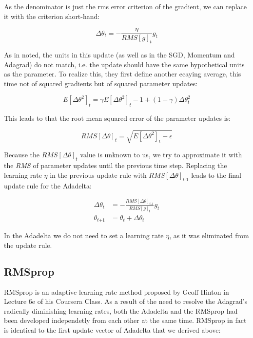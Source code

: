\documentclass[12pt,oneside,a4paper,parskip]{scrbook}
\begin{document}
As the denominator is just the \ac{rms} error criterion of the gradient, we can replace
it with the criterion short-hand: 

\begin{equation}
  \Delta\theta_\textit{t} = -\frac{\eta}{RMS[\textit{g}]_t} \textit{g}_\textit{t}
\end{equation}

As in \cite{AdadeltaAddition} noted, the units in this update (as well as in the SGD, Momentum and Adagrad) do not match,
i.e. the update should have the same hypothetical units as the parameter. To realize this, they first define another 
ecaying average, this time not of squared gradients but of squared parameter updates:

\begin{equation}
  \textit{E}[\Delta\theta^2]_t = \gamma\textit{E}[\Delta\theta^2]_t-1 + (1-\gamma)\Delta\theta^2_t
  \label{equ:adadelta_4}
\end{equation}

This leads to that the root mean squared error of the parameter updates is:

\begin{equation}
  \textit{RMS}[\Delta\theta]_t = \sqrt{\textit{E}[\Delta\theta^2]_t + \epsilon}
\end{equation}

Because the $\textit{RMS}[\Delta\theta]_t$ value is unknown to us, we try to approximate it with the \textit{RMS} of 
parameter updates until the previous time step. Replacing the learning rate $\eta$ in the previous update rule with $\textit{RMS}[\Delta\theta]_\textit{t-1}$
leads to the final update rule for the Adadelta:

\begin{equation}
  \begin{split}
  \Delta\theta_t &= - \frac{\textit{RMS}[\Delta\theta]_\textit{t-1}}{RMS[\textit{g}]_t} \textit{g}_\textit{t} \\
  \theta_\textit{t+1} &= \theta_t + \Delta\theta_t
  \end{split}
  \label{equ:adadelta_2}
\end{equation}

In the Adadelta we do not need to set a learning rate $\eta$, as it was eliminated from the update rule. \cite{overvieDiffRSLVQ}

\subsection{RMSprop}
RMSprop is an adaptive learning rate method proposed by Geoff Hinton in Lecture 6e of his Coursera Class. \cite{RMSprop_Hinton}
As a result of the need to resolve the Adagrad's radically diminishing learning rates, both the Adadelta and 
the RMSprop had been developed independetly from each other at the same time. RMSprop in fact is identical
to the first update vector of Adadelta that we derived above:
\end{document}
